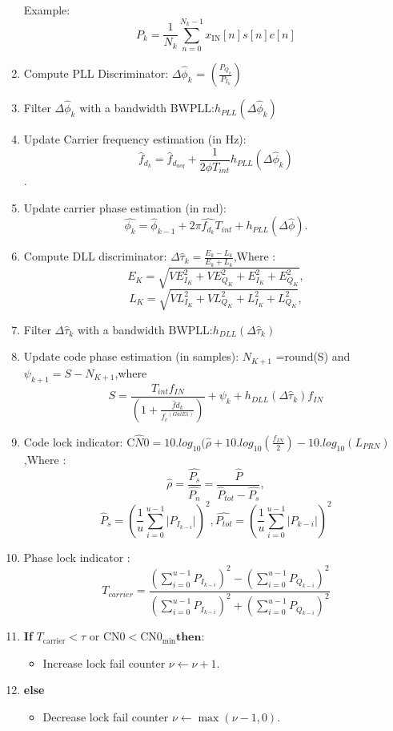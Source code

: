 \begin{enumerate}
 Example:  \[ P_k = \frac{1}{N_k}\sum_{n=0}^{N_k-1} x_{\text{IN}}[n]s[n]c[n] \]
  \item Compute PLL Discriminator: $\Delta \hat{\phi}_k$ = $(\frac{P_{Q_k}}{P_{I_k}})$
   \item Filter  $\Delta \hat{\phi}_k$ with a bandwidth BW{PLL}:$h_{PLL}(\Delta \hat{\phi}_k)$
   \item Update Carrier frequency estimation (in Hz):
   \[ \hat{f}_{d_k} = \hat{f}_{d_{acq}}+\frac{1}{2\phi T_{int}}h_{PLL}(\Delta \hat{\phi}_k) \].
   \item Update carrier phase estimation (in rad):
   \[ \hat{\phi_k}=\hat{\phi}_{k-1}+2\pi\hat{f_{d_k}}T_{int}+h_{PLL}(\Delta\hat{\phi}).\]
   \item Compute DLL discriminator: $\Delta \hat{\tau}_k=\frac{E_k-L_k}{E_k+L_k}$,Where :
    \[ E_K=\sqrt{{VE}_{I_K}^2+VE_{Q_K}^2+E_{I_K}^2+E_{Q_K}^2},\]
    \[ L_K=\sqrt{{VL}_{I_K}^2+VL_{Q_K}^2+L_{I_K}^2+L_{Q_K}^2},\]
     \item Filter  $\Delta \hat{\tau}_k$ with a bandwidth BW{PLL}:$h_{DLL}(\Delta \hat{\tau}_k)$
    \item Update code phase estimation (in samples):
        $N_{K+1}$ =round(S) and $\psi_{k+1} =S-N_{K+1}$,where 
       \[S=\frac{T_{int}f_{IN}}{(1+\frac{\hat{f}d_k}{{f_c}^{(Gal E1)}})}+\psi_k+ h_{DLL} (\Delta \hat{\tau}_k)f_{IN}\]
    \item Code lock indicator:
    C$\hat{N}0=10.log_{10}(\hat{\rho}+10.log_{10}(\frac{f_{IN}}{2})-10.log_{10}(L_{PRN})$,Where :\[\hat{\rho}=\frac{\hat{P_s}}{\hat{P_n}}=\frac{\hat{P}}{\hat{P}_{tot}-\hat{P_s}},\]
    \[ \hat{P}_s = (\frac{1}{u} \sum_{i=0}^{u-1} \lvert P_{I_{k-i}} \rvert )^2 ,  \hat{P_{tot}} = (\frac{1}{u} \sum_{i=0}^{u-1} \lvert P_{{k-i}} \rvert )^2 \]
    \item Phase lock indicator :
   \[ T_{carrier} = \frac{( \sum_{i=0}^{u-1}  P_{I_{k-i}})^2 - ( \sum_{i=0}^{u-1} P_{Q_{k-i}})^2 }{( \sum_{i=0}^{u-1}  P_{I_{k-i}})^2 +( \sum_{i=0}^{u-1}  P_{Q_{k-i}})^2 } \]
   \item \textbf{If} $T_{\text{carrier}} < \tau$ or $\text{CN0} < \text{CN0}_{\text{min}} \textbf{then}$:
    \begin{itemize}
            \item Increase lock fail counter $\nu \leftarrow \nu + 1$.
        \end{itemize}
   \item  \textbf{else}
        \begin{itemize}
            \item Decrease lock fail counter $\nu \leftarrow \max(\nu - 1, 0)$.

\end{itemize}
\end{enumerate}
